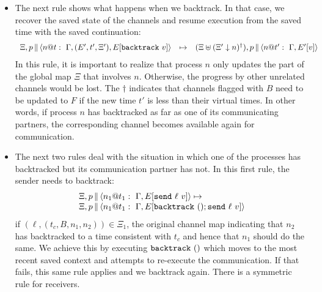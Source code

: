 \documentclass{article}
\begin{document}
\begin{itemize}
\item The next rule shows what happens when we backtrack. In that case, we
  recover the saved state of the channels and resume execution from the saved
  time with the saved continuation:
\[\begin{array}{rcl}
  \Xi,\parc{p}{\proc{n}{\Gamma,(E',t',\Xi')}{E[\backtrack{v}]}{t}} 
  &\mapsto& 
  (\Xi\uplus(\Xi'\downarrow n)^\dagger),\parc{p}{\proc{n}{\Gamma}{E'[v]}{t'}} 
\end{array}\]
In this rule, it is important to realize that process $n$ only updates the 
part of the global map $\Xi$ that involves $n$. Otherwise, the progress 
by other unrelated channels would be lost. The $\dagger$ indicates that channels 
flagged with $B$ need to be updated to $F$ if the new time $t'$ is less than their
virtual times. In other words, if process $n$ has backtracked as far as one of
its communicating partners, the corresponding channel becomes available again 
for communication. 

\item The next two rules deal with the situation in which one of the
  processes has backtracked but its communication partner has not. In this
  first rule, the sender needs to backtrack:
\[\begin{array}{l}
  \Xi,
  \parc{p}{\proc{n_1}{\Gamma}{E[\send{\ell}{v}]}{t_1}} \mapsto \\
  \Xi,
  \parc{p}{\proc{n_1}{\Gamma}{E[\backtrack{()}; \send{\ell}{v}]}{t_1}}
\end{array}\]
if $(\ell,(t_c,B,n_1,n_2)) \in \Xi_1$, the original channel map indicating
that $n_2$ has backtracked to a time consistent with $t_c$ and hence that
$n_1$ should do the same. We achieve this by executing $\backtrack{()}$ which
moves to the most recent saved context and attempts to re-execute the
communication.  If that fails, this same rule applies and we backtrack again.
There is a symmetric rule for receivers.

\end{itemize}

\end{document}
